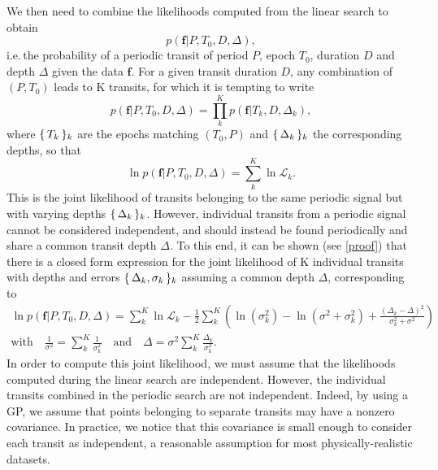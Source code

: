 \documentclass[modern]{aastex631}
\begin{document}
We then need to combine the likelihoods computed from the linear search to obtain
\begin{equation*}
    p(\bm{f} \vert P, T_0 , D, \Delta),
\end{equation*}
i.e.\,the probability of a periodic transit of period $P$, epoch $T_0$, duration $D$ and depth $\Delta$ given the data $\bm{f}$. For a given transit duration $D$, any combination of $(P, T_0)$ leads to K transits, for which it is tempting to write
\begin{equation}\label{eq:attempt}
    p(\bm{f} \vert P, T_0 ,D, \Delta) = \prod_k^K p(\bm{f} \vert T_k, D, \Delta_k),
\end{equation}
where $\{\,T_k\,\}_k$ are the epochs matching $(T_0, P)$ and $\{\,\Delta_k\,\}_k$ the corresponding depths, so that
\begin{equation*}
    \ln p(\bm{f} \vert P, T_0 ,D, \Delta) = \sum_k^K \ln \mathcal{L}_k.
\end{equation*}
This is the joint likelihood of transits belonging to the same periodic signal but with varying depths  $\{\,\Delta_k\,\}_k$. However, individual transits from a periodic signal cannot be considered independent, and should instead be found periodically and share a common transit depth $\Delta$. To this end, it can be shown (see \autoref{proof}) that there is a closed form expression for the joint likelihood of K individual transits with depths and errors $\{\,\Delta_k, \sigma_k\,\}_k$ assuming a common depth $\Delta$, corresponding to 
\begin{equation}\label{eq:result}
    \begin{gathered}
        \ln p(\bm{f} \vert P, T_0 ,D, \Delta) =  \sum_{k}^K \ln \mathcal{L}_k  - \frac{1}{2} \sum_k^K\left(\ln(\sigma_{k}^2) - \ln(\sigma^{2} + \sigma_{k}^{2}) +  \frac{\left(\Delta_{k} -
        \Delta\right)^{2}}{\sigma_k^{2} + \sigma^{2}}\right) \\
        \text{with} \quad  \frac{1}{\sigma^2} = \sum_k^K \frac{1}{\sigma_k^2} \quad \text{and} \quad
        \Delta = \sigma^2 \sum_k^K {\frac{\Delta_k}{\sigma_k^2}}.
    \end{gathered}
\end{equation}
In order to compute this joint likelihood, we must assume that the likelihoods computed during the linear search are independent. However, the individual transits combined in the periodic search are not independent. Indeed, by using a GP, we assume that points belonging to separate transits may have a nonzero covariance. In practice, we notice that this covariance is small enough to consider each transit as independent, a reasonable assumption for most physically-realistic datasets.\\\\
\end{document}
